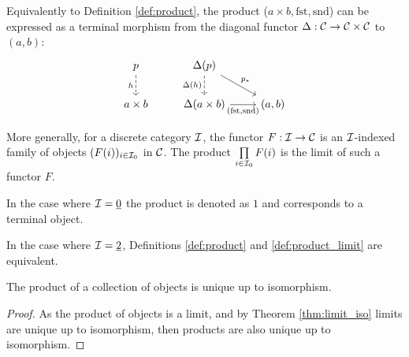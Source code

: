 \begin{definition}
	Equivalently to Definition \ref{def:product}, the product ($a\times b,
	\mathrm{fst}, \mathrm{snd}$) can be expressed as a terminal morphism from the diagonal functor $\Delta: \mathcal{C} \to \mathcal{C}\times \mathcal{C}$ to $(a, b)$:
	\[\begin{tikzcd}[ampersand replacement=\&]
		p \& {\Delta(p)} \\
		{a\times b} \& {\Delta(a\times b)} \& {(a,b)}
		\arrow["h"', dashed, from=1-1, to=2-1]
		\arrow["{\Delta(h)}"', dashed, from=1-2, to=2-2]
		\arrow["{p_*}", from=1-2, to=2-3]
		\arrow["{(\mathrm{fst}, \mathrm{snd})}"', from=2-2, to=2-3]
	\end{tikzcd}\]

\end{definition}

\begin{definition}

	More generally, for a discrete category $\mathcal{I}$, the functor $F:\mathcal{I}\to \mathcal{C}$ is an
	$\mathcal{I}$-indexed family of objects $(F(i))_{i\in \mathcal{I}_0}$ in $\mathcal{C}$. The product
	$\prod\limits_{i\in \mathcal{I}_0} F(i)$ is the limit of such a functor $F$.
	\parencite{leinster:basic_category_theory}
\end{definition}

\begin{remark}
	In the case where $\mathcal{I}=\underline{0}$ the product is denoted as $1$ and
	corresponds to a terminal object.
\end{remark}

\begin{remark}
	In the case where $\mathcal{I}=\underline{2}$, Definitions \ref{def:product} and
	\ref{def:product_limit} are equivalent.
\end{remark}

\begin{theorem}
	The product of a collection of objects is unique up to isomorphism.

	\begin{proof}
		As the product of objects is a limit, and by Theorem \ref{thm:limit_iso}
		limits are unique up to isomorphism, then products are also unique up to
		isomorphism.
	\end{proof}
\end{theorem}

